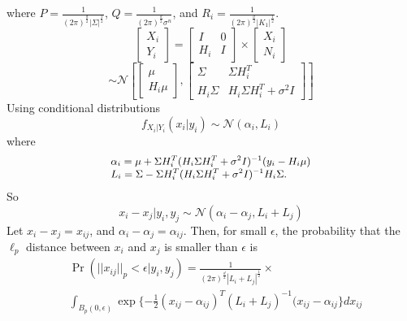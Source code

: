 \documentclass{article}
\begin{document}
where $P=\frac{1}{({2\pi})^{\frac{d}{2}}{|\Sigma|}^{\frac{1}{2}}}$, $Q=\frac{1}{({2\pi})^{\frac{d}{2}}\sigma^n}$, and $R_i=\frac{1}{({2\pi})^{\frac{d}{2}} {|K_1|}^{\frac{1}{2}}}$.
\begin{equation}
 \left[\begin{array}{c} X_i \\ Y_i \end{array}\right] = 
\begin{bmatrix} I & 0 \\ H_i & I \end{bmatrix} \times \left[ \begin{array}{c} X_i \\ N_i \end{array} \right]      
\end{equation}
\begin{equation}
 \sim \mathcal{N} \left[\begin{bmatrix} \mu \\ H_i \mu \end{bmatrix}, \begin{bmatrix} \Sigma & \Sigma H_i^T \\ H_i \Sigma & H_i \Sigma H_i^T + \sigma^2 I \end{bmatrix} \right]
\end{equation}
\noindent
Using conditional distributions
 \begin{equation}
  f_{X_i|Y_i}(x_i|y_i) \sim \mathcal{N}(\alpha_i, L_i)
 \end{equation}
where 
\begin{equation}
\small{
\begin{array}{l}\alpha_i = \mu + \Sigma H_i^T (H_i \Sigma H_i^T + \sigma^2 I)^{-1} (y_i - H_i \mu) \\ L_i = \Sigma - \Sigma H_i^T (H_i \Sigma H_i^T + \sigma^2 I)^{-1} H_i \Sigma .
       \end{array}}  
\end{equation}
So
\begin{equation}
x_i - x_j|y_i, y_j \sim \mathcal{N}(\alpha_i-\alpha_j, L_i+L_j)
\end{equation}
Let $x_i - x_j = x_{ij}$, and $\alpha_i -\alpha_j=\alpha_{ij}$. Then, for small $\epsilon$, the probability that the $\ell_p$ distance between $x_i$ and $x_j$ is smaller than $\epsilon$ is
\begin{align}
&\Pr(||x_{ij}||_{p} < \epsilon|y_i,y_j)   \nonumber
										=   \frac{1}{(2 \pi)^{\frac{d}{2}} |L_{i}+L_{j}|^ \frac{1}{2}} \times \\ 
										& \int_{B_p(0,\epsilon) }^{}\exp \{ -\frac{1}{2}(x_{ij} - \alpha_{ij})^T(L_i+L_j)^{-1}(x_{ij} - \alpha_{ij}\}dx_{ij} 
\end{align}
\end{document}
